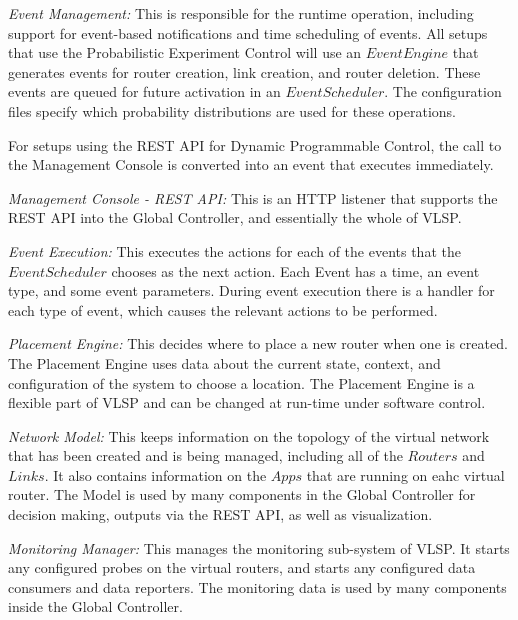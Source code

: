 \begin{description}[leftmargin=1.5em,labelindent=0,itemsep=3pt]

\item \textit{Event Management:} This is responsible for the runtime operation,
including support for event-based notifications and time scheduling of
events.  All setups that use the Probabilistic Experiment Control will
use an $Event Engine$ that generates events for router creation, link
creation, and router deletion.  These events are queued for
future activation in an $Event Scheduler$.  The configuration files
specify which probability distributions are used for these operations.

For setups using the REST API for Dynamic Programmable Control, the
call to the Management Console is converted into an event that
executes immediately.

\item \textit{Management Console - REST API:} This is an HTTP listener
  that supports the REST API into the Global Controller, and essentially the whole
  of VLSP.

\item \textit{Event Execution:} This executes the actions for each of
the events that the  $Event Scheduler$ chooses as the next action.
Each Event has a time, an event type, and some event
parameters. During event execution there is a handler for each type of
event, which causes the relevant actions to be performed.

\item \textit{Placement Engine:} This decides where to place a new
  router when one is created. The Placement Engine uses data about the
  current state, context, and configuration of the system to choose a
  location. The Placement Engine is a flexible part of VLSP and can be
  changed at run-time under software control.

\item \textit{Network Model:} This keeps information on the topology
  of the virtual network that has been created and is being managed,
  including all of the $Routers$ and $Links$. It also contains
  information on the $Apps$ that are running on eahc virtual router.
  The Model is used by many components in the Global Controller for
  decision making, outputs via the REST API, as well as visualization.

\item \textit{Monitoring Manager:} This manages the monitoring
  sub-system of VLSP.  It starts any configured probes on the virtual
  routers, and starts any configured data consumers and data reporters. The monitoring
  data is used by many components inside the Global Controller.


\end{description}

